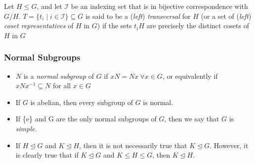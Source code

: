 \documentclass[../Odyssey_Project.tex]{subfiles}
\begin{document}
\smallskip
\noindent Let $H \leq G$, and let $\mathcal{I}$ be an indexing set that is in bijective correspondence with $G/H$. $T = \{t_i \mid i \in \mathcal{I}\} \subseteq G$ is said to be a (\emph{left}) \emph{transversal} for $H$ (or a set of (\emph{left}) \emph{coset representatives} of $H$ in $G$) if the sets $t_i H$ are precisely the distinct cosets of $H$ in $G$
\subsubsection*{Normal Subgroups}
\begin{itemize}
    \item $N$ is a \emph{normal subgroup} of $G$ if $xN = N x \ \forall x \in G$, or equivalently if $xNx^{-1} \subseteq N$ for all $x \in G$
    \item If $G$ is abelian, then every subgroup of $G$ is normal. 
    \item If \{e\} and G are the only normal subgroups of $G$, then we say that $G$ is \emph{simple}. 
    \item If $H \trianglelefteq G$ and $K \trianglelefteq H$, then it is not necessarily true that $K \trianglelefteq G$. However, it is clearly true that if $K \trianglelefteq G$ and $K \leq H \leq G$, then $K \trianglelefteq H$.
\end{itemize}
\end{document}
